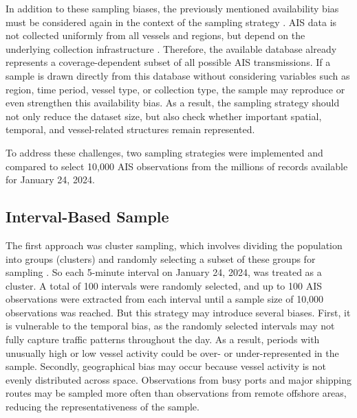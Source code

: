 \documentclass[10pt,a4paper]{article}
\begin{document}
In addition to these sampling biases, the previously mentioned availability bias must be considered again in 
the context of the sampling strategy \cite{8}. AIS data is not collected uniformly from all vessels and regions, but depend on the underlying collection infrastructure \cite{4,5}.
Therefore, the available database already represents a coverage-dependent subset of all possible AIS transmissions. If a sample is drawn directly from this 
database without considering variables such as region, time period, vessel type, or collection type, the sample may reproduce or even strengthen this availability bias.
As a result, the sampling strategy should not only reduce the dataset size, but also check whether important spatial, temporal, and vessel-related structures remain 
represented.

To address these challenges, two sampling strategies were implemented and compared to select 10,000 AIS
observations from the millions of records available for January 24, 2024.


\subsection{Interval-Based Sample}

The first approach was cluster sampling, which involves dividing the population into groups (clusters) and
randomly selecting a subset of these groups for sampling \cite{12}. So each 5-minute interval on January 24, 2024,
was treated as a cluster. A total of 100 intervals were randomly selected, and up to 100 AIS observations were
extracted from each interval until a sample size of 10,000 observations was reached. But this strategy may
introduce several biases. First, it is vulnerable to the temporal bias, as the randomly selected intervals may
not fully capture traffic patterns throughout the day. As a result, periods with unusually high or low vessel
activity could be over- or under-represented in the sample. Secondly, geographical bias may occur because
vessel activity is not evenly distributed across space. Observations from busy ports and major shipping routes
may be sampled more often than observations from remote offshore areas, reducing the representativeness of
the sample.

\end{document}
